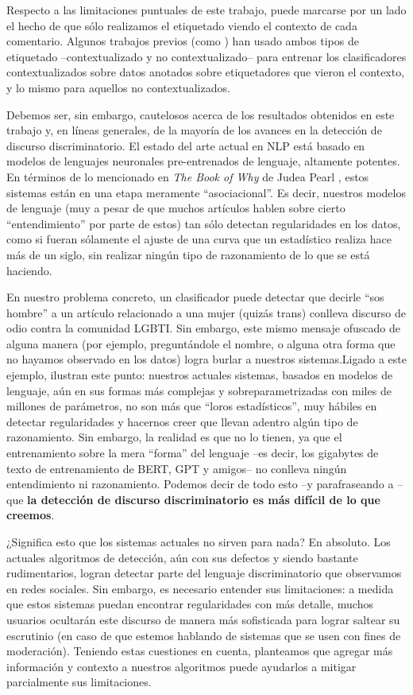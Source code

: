 Respecto a las limitaciones puntuales de este trabajo, puede marcarse por un lado el hecho de que sólo realizamos el etiquetado viendo el contexto de cada comentario. Algunos trabajos previos (como \cite{pavlopoulos2020toxicity}) han usado ambos tipos de etiquetado --contextualizado y no contextualizado-- para entrenar los clasificadores contextualizados sobre datos anotados sobre etiquetadores que vieron el contexto, y lo mismo para aquellos no contextualizados.

Debemos ser, sin embargo, cautelosos acerca de los resultados obtenidos en este trabajo y, en líneas generales, de la mayoría de los avances en la detección de discurso discriminatorio. El estado del arte actual en NLP está basado en modelos de lenguajes neuronales pre-entrenados de lenguaje, altamente potentes. En términos de lo mencionado en \emph{The Book of Why} de Judea Pearl \cite{pearl2018book}, estos sistemas están en una etapa meramente ``asociacional''. Es decir, nuestros modelos de lenguaje (muy a pesar de que muchos artículos hablen sobre cierto ``entendimiento'' por parte de estos) tan sólo detectan regularidades en los datos, como si fueran sólamente el ajuste de una curva que un estadístico realiza hace más de un siglo, sin realizar ningún tipo de razonamiento de lo que se está haciendo.

En nuestro problema concreto, un clasificador puede detectar que decirle ``sos hombre'' a un artículo relacionado a una mujer (quizás trans) conlleva discurso de odio contra la comunidad LGBTI. Sin embargo, este mismo mensaje ofuscado de alguna manera (por ejemplo, preguntándole el nombre, o alguna otra forma que no hayamos observado en los datos) logra burlar a nuestros sistemas.Ligado a este ejemplo, \cite{bender-koller-2020-climbing} ilustran este punto: nuestros actuales sistemas, basados en modelos de lenguaje, aún en sus formas más complejas y sobreparametrizadas con miles de millones de parámetros, no son más que ``loros estadísticos'', muy hábiles en detectar regularidades y hacernos creer que llevan adentro algún tipo de razonamiento. Sin embargo, la realidad es que no lo tienen, ya que el entrenamiento sobre la mera ``forma'' del lenguaje --es decir, los gigabytes de texto de entrenamiento de BERT, GPT y amigos-- no conlleva ningún entendimiento ni razonamiento. Podemos decir de todo esto --y parafraseando a \citet{mitchell2021ai}-- que \textbf{la detección de discurso discriminatorio es más difícil de lo que creemos}.

¿Significa esto que los sistemas actuales no sirven para nada? En absoluto. Los actuales algoritmos de detección, aún con sus defectos y siendo bastante rudimentarios, logran detectar parte del lenguaje discriminatorio que observamos en redes sociales. Sin embargo, es necesario entender sus limitaciones: a medida que estos sistemas puedan encontrar regularidades con más detalle, muchos usuarios ocultarán este discurso de manera más sofisticada para lograr saltear su escrutinio (en caso de que estemos hablando de sistemas que se usen con fines de moderación). Teniendo estas cuestiones en cuenta, planteamos que agregar más información y contexto a nuestros algoritmos puede ayudarlos a mitigar parcialmente sus limitaciones.


